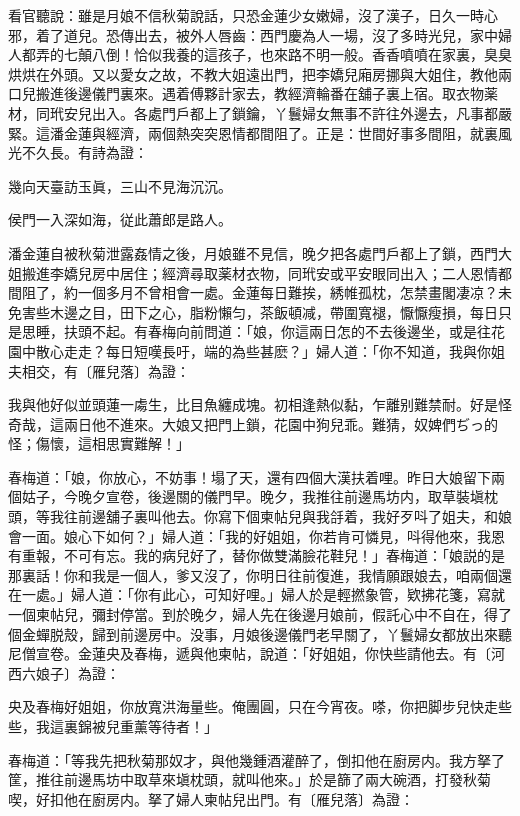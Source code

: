 看官聽說：雖是月娘不信秋菊說話，只恐金蓮少女嫩婦，沒了漢子，日久一時心邪，着了道兒。恐傳出去，被外人唇齒：西門慶為人一場，沒了多時光兒，家中婦人都弄的七顛八倒！恰似我養的這孩子，也來路不明一般。香香噴噴在家裏，臭臭烘烘在外頭。又以愛女之故，不教大姐遠出門，把李嬌兒廂房挪與大姐住，教他兩口兒搬進後邊儀門裏來。遇着傅夥計家去，教經濟輪番在舖子裏上宿。取衣物薬材，同玳安兒出入。各處門戶都上了鎖鑰，丫鬟婦女無事不許往外邊去，凡事都嚴緊。這潘金蓮與經濟，兩個熱突突恩情都間阻了。正是：世間好事多間阻，就裏風光不久長。有詩為證：

\begin{myquote}
幾向天臺訪玉眞，三山不見海沉沉。

侯門一入深如海，従此蕭郎是路人。
\end{myquote}

潘金蓮自被秋菊泄露姦情之後，月娘雖不見信，晚夕把各處門戶都上了鎖，西門大姐搬進李嬌兒房中居住；經濟尋取薬材衣物，同玳安或平安眼同出入；二人恩情都間阻了，約一個多月不曾相會一處。金蓮每日難挨，綉帷孤枕，怎禁畫閣凄凉？未免害些木邊之目，田下之心，脂粉懶匀，茶飯頓减，帶圍寬褪，懨懨瘦損，每日只是思睡，扶頭不起。有春梅向前問道：「娘，你這兩日怎的不去後邊坐，或是往花園中散心走走？每日短嘆長吁，端的為些甚麽？」婦人道：「你不知道，我與你姐夫相交，有〔雁兒落〕為證：

\begin{myquote}
我與他好似並頭蓮一䖏生，比目魚纏成塊。初相逢熱似黏，乍離别難禁耐。好是怪奇哉，這兩日他不進來。大娘又把門上鎖，花園中狗兒乖。難猜，奴婢們ぢっ的怪；傷懷，這相思實難解！」
\end{myquote}

春梅道：「娘，你放心，不妨事！塌了天，還有四個大漢扶着哩。昨日大娘留下兩個姑子，今晚夕宣卷，後邊關的儀門早。晚夕，我推往前邊馬坊内，取草裝塡枕頭，等我往前邊舖子裏叫他去。你寫下個柬帖兒與我㧱着，我好歹呌了姐夫，和娘會一面。娘心下如何？」婦人道：「我的好姐姐，你若肯可憐見，呌得他來，我恩有重報，不可有忘。我的病兒好了，替你做雙滿臉花鞋兒！」春梅道：「娘説的是那裏話！你和我是一個人，爹又沒了，你明日往前復進，我情願跟娘去，咱兩個還在一處。」婦人道：「你有此心，可知好哩。」婦人於是輕撚象管，欵拂花箋，寫就一個柬帖兒，彌封停當。到於晚夕，婦人先在後邊月娘前，假託心中不自在，得了個金蟬脱殼，歸到前邊房中。没事，月娘後邊儀門老早關了，丫鬟婦女都放出來聽尼僧宣卷。金蓮央及春梅，遞與他柬帖，說道：「好姐姐，你快些請他去。有〔河西六娘子〕為證：

央及春梅好姐姐，你放寬洪海量些。俺團圓，只在今宵夜。嗏，你把脚步兒快走些些，我這裏錦被兒重薰等待者！」

春梅道：「等我先把秋菊那奴才，與他幾鍾酒灌醉了，倒扣他在廚房内。我方拏了筐，推往前邊馬坊中取草來塡枕頭，就叫他來。」於是篩了兩大碗酒，打發秋菊喫，好扣他在廚房内。拏了婦人柬帖兒出門。有〔雁兒落〕為證：

